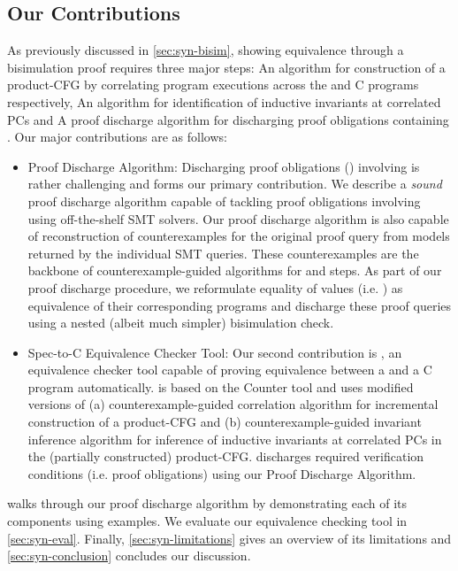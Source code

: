\subsection{Our Contributions}
\label{sec:syn-contribs}
As previously discussed in \cref{sec:syn-bisim}, showing equivalence through a bisimulation proof
requires three major steps:
 An algorithm for construction of a product-CFG by correlating
program executions across the \SpecL{} and C programs respectively,
 An algorithm for identification of inductive invariants at correlated PCs and
 A proof discharge algorithm for discharging proof obligations containing \recursiveRelations{}.
Our major contributions are as follows:

\begin{itemize}
\setlength{\itemsep}{0px}
\item Proof Discharge Algorithm: Discharging proof obligations ()
involving \recursiveRelations{} is rather challenging and forms our primary contribution.
We describe a {\em sound} proof discharge algorithm capable of tackling proof obligations involving
\recursiveRelations{} using off-the-shelf SMT solvers. Our proof discharge algorithm is also capable of
reconstruction of counterexamples for the original proof query from models returned by the individual SMT queries.
These counterexamples are the backbone of counterexample-guided algorithms for
 and  steps. As part of our proof discharge procedure,
we reformulate equality of values (i.e. \recursiveRelations{}) as equivalence of their corresponding programs
and discharge these proof queries using a nested (albeit much simpler) bisimulation check.

\item Spec-to-C Equivalence Checker Tool: Our second contribution is \toolName{}, an equivalence checker tool
capable of proving equivalence between a \SpecL{} and a C program automatically. \toolName{} is based on
the Counter tool\cite{oopsla20} and uses modified versions of (a) counterexample-guided correlation algorithm for
incremental construction of a product-CFG and (b) counterexample-guided invariant inference algorithm
for inference of inductive invariants at correlated PCs in the (partially constructed) product-CFG.
\toolName{} discharges required verification conditions (i.e. proof obligations) using our Proof Discharge Algorithm.
\end{itemize}
\vspace{-5px}
 walks through our proof discharge algorithm by demonstrating each of its
components using examples. We evaluate our equivalence checking tool \toolName{} in \cref{sec:syn-eval}.
Finally, \cref{sec:syn-limitations} gives an overview of its limitations and \cref{sec:syn-conclusion} concludes our discussion.